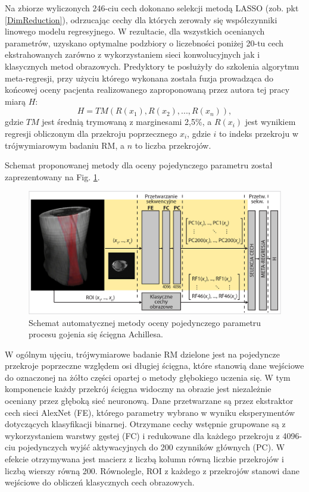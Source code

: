 Na zbiorze wyliczonych 246-ciu cech dokonano selekcji metodą LASSO (zob. pkt \ref{DimReduction}), odrzucając cechy dla których zerowały się współczynniki linowego modelu regresyjnego. W rezultacie, dla wszystkich ocenianych parametrów, uzyskano optymalne podzbiory o liczebności poniżej 20-tu cech ekstrahowanych zarówno z wykorzystaniem sieci konwolucyjnych jak i klasycznych metod obrazowych. Predyktory \linebreak te posłużyły do szkolenia algorytmu meta-regresji, przy użyciu którego wykonana została fuzja prowadząca do końcowej oceny pacjenta realizowanego zaproponowaną przez autora tej pracy miarą $H$:
\begin{equation}
\label{ecq:H}
H = TM(R(x_1), R(x_2),..., R(x_n)),
\end{equation}
gdzie $TM$ jest średnią trymowaną z marginesami 2,5\%, a $R(x_i)$ jest wynikiem regresji obliczonym dla przekroju poprzecznego $x_i$, gdzie $i$ to indeks przekroju w trójwymiarowym badaniu RM, a $n$ to liczba przekrojów.

Schemat proponowanej metody dla oceny pojedynczego parametru został zaprezentowany na Fig. \ref{fig:net}. 
\begin{figure}[h!]
	\includegraphics[width=\textwidth]{figures/net.jpg}
	\caption{Schemat automatycznej metody oceny pojedynczego parametru procesu gojenia się ścięgna Achillesa.} \label{fig:net}
\end{figure}

W ogólnym ujęciu, trójwymiarowe badanie RM dzielone jest na pojedyncze przekroje poprzeczne względem osi długiej ścięgna, które stanowią dane wejściowe do oznaczonej na żółto części opartej o metody głębokiego uczenia się. W tym komponencie każdy przekrój ścięgna widoczny na obrazie jest niezależnie oceniany przez głęboką sieć neuronową. Dane przetwarzane są przez ekstraktor cech sieci AlexNet (FE), którego parametry wybrano w wyniku eksperymentów dotyczących klasyfikacji binarnej. Otrzymane cechy wstępnie grupowane są z wykorzystaniem warstwy gęstej (FC) i redukowane dla każdego przekroju z 4096-ciu pojedynczych wyjść aktywacyjnych do 200 czynników głównych (PC). W efekcie otrzymywana jest macierz z liczbą kolumn równą liczbie przekrojów i liczbą wierszy równą 200. Równolegle, ROI z każdego z przekrojów stanowi dane wejściowe do obliczeń klasycznych cech obrazowych. 

